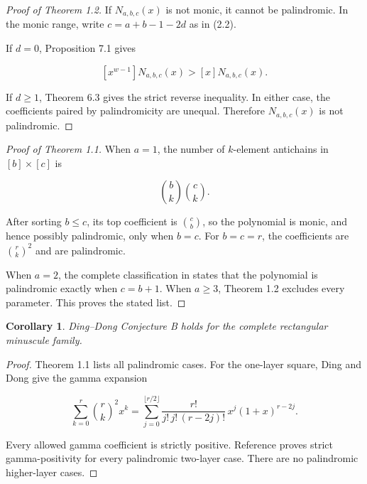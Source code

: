 \documentclass[11pt]{article}
\newtheorem{corollary}[theorem]{Corollary}
\numberwithin{equation}{section}
\begin{document}
\begin{proof}[Proof of Theorem 1.2]

If $N_{a,b,c}(x)$ is not monic, it cannot be palindromic. In the monic
range, write $c=a+b-1-2d$ as in (2.2).

If $d=0$, Proposition 7.1 gives

\nopagebreak[4]
\[
[x^{w-1}]N_{a,b,c}(x)>[x]N_{a,b,c}(x).
\]

If $d\ge1$, Theorem 6.3 gives the strict reverse inequality. In either case,
the coefficients paired by palindromicity are unequal. Therefore
$N_{a,b,c}(x)$ is not palindromic.
\end{proof}


\begin{proof}[Proof of Theorem 1.1]

When $a=1$, the number of $k$-element antichains in
$[b]\times[c]$ is

\nopagebreak[4]
\[
\binom{b}{k}\binom{c}{k}.
\]

After sorting $b\le c$, its top coefficient is $\binom{c}{b}$, so the
polynomial is monic, and hence possibly palindromic, only when $b=c$.
For $b=c=r$, the coefficients are $\binom{r}{k}^2$ and are palindromic.

When $a=2$, the complete classification in \cite{carptopus2026} states that the polynomial is
palindromic exactly when $c=b+1$. When $a\ge3$, Theorem 1.2 excludes every
parameter. This proves the stated list.
\end{proof}


\Needspace{0.25\textheight}
\begin{corollary}

Ding--Dong Conjecture B holds for the complete rectangular minuscule family.

\end{corollary}

\begin{proof}

Theorem 1.1 lists all palindromic cases. For the one-layer square, Ding and
Dong \cite[Proposition~2.4]{ding2019} give the gamma expansion

\nopagebreak[4]
\[
\sum_{k=0}^{r}\binom{r}{k}^2x^k
=
\sum_{j=0}^{\lfloor r/2\rfloor}
\frac{r!}{j!\,j!\,(r-2j)!}\,
x^j(1+x)^{r-2j}.
\]

Every allowed gamma coefficient is strictly positive. Reference \cite{carptopus2026} proves
strict gamma-positivity for every palindromic two-layer case. There are no
palindromic higher-layer cases.
\end{proof}
\end{document}
